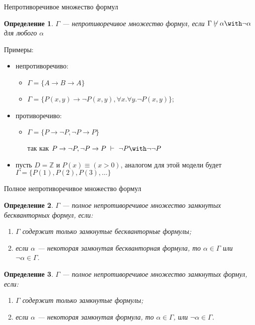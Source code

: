 \documentclass[aspectratio=169]{beamer}
\newtheorem{dfn}{Определение}[section]
\begin{document}
\begin{frame}{Непротиворечивое множество формул}
\begin{dfn}$\Gamma$ --- \emph{непротиворечивое множество формул},
если $\Gamma\not\vdash\alpha\with\neg\alpha$ для любого $\alpha$
\end{dfn}\pause

Примеры:
\begin{itemize}
\item непротиворечиво: \begin{itemize}
\item $\Gamma = \{A \rightarrow B \rightarrow A\}$\pause
\item $\Gamma = \{P(x,y)\rightarrow\neg P(x,y), \forall x.\forall y.\neg P(x,y)\}$;
\end{itemize}\pause
\item противоречиво: \begin{itemize}
\item $\Gamma = \{P\rightarrow\neg P, \neg P \rightarrow P\}$

так как
$P\rightarrow\neg P, \neg P \rightarrow P \ \vdash\  \neg P \with \neg\neg P$\pause
\end{itemize}
\item пусть $D = \mathbb{Z}$ и $P(x) \equiv (x > 0)$, аналогом для этой модели
будет $\Gamma = \{P(1), P(2), P(3), \dots\}$
\end{itemize}
\end{frame}

\begin{frame}{Полное непротиворечивое множество формул}
\begin{dfn}$\Gamma$ --- \emph{полное} непротиворечивое множество замкнутых бескванторных формул,
если:
\begin{enumerate}\item $\Gamma$ содержит только замкнутые бескванторные формулы;
\item если $\alpha$ --- некоторая замкнутая бескванторная формула, то $\alpha\in\Gamma$ или $\neg\alpha\in\Gamma$.
\end{enumerate}
\end{dfn}\pause

\begin{dfn}$\Gamma$ --- \emph{полное} непротиворечивое множество замкнутых формул, если:
\begin{enumerate}\item $\Gamma$ содержит только замкнутые формулы;
\item если $\alpha$ --- некоторая замкнутая формула, то $\alpha \in \Gamma$, или $\neg\alpha \in \Gamma$.
\end{enumerate}
\end{dfn}
\end{frame}
\end{document}
